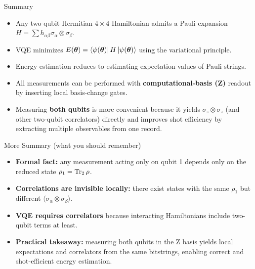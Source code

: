 \documentclass[aspectratio=169]{beamer}
\newcommand{\Z}{\sigma_z}
\begin{document}
\begin{frame}{Summary}
\begin{itemize}
  \item Any two-qubit Hermitian \(4\times 4\) Hamiltonian admits a Pauli expansion \(H=\sum h_{\alpha\beta}\sigma_\alpha\otimes\sigma_\beta\).
  \item VQE minimizes \(E(\bm{\theta})=\bra{\psi(\bm{\theta})}H\ket{\psi(\bm{\theta})}\) using the variational principle.
  \item Energy estimation reduces to estimating expectation values of Pauli strings.
  \item All measurements can be performed with \textbf{computational-basis (Z)} readout by inserting local basis-change gates.
  \item Measuring \textbf{both qubits} is more convenient because it yields \(\Z\otimes\Z\) (and other two-qubit correlators) directly and improves shot efficiency by extracting multiple observables from one record.
\end{itemize}
\end{frame}

\begin{frame}{More Summary (what you should remember)}
\begin{itemize}
\item \textbf{Formal fact:} any measurement acting only on qubit 1 depends only on the reduced state \(\rho_1=\Tr_2\rho\).
\item \textbf{Correlations are invisible locally:} there exist states with the same \(\rho_1\) but different \(\langle \sigma_\alpha\otimes\sigma_\beta\rangle\).
\item \textbf{VQE requires correlators} because interacting Hamiltonians include two-qubit terms at least.
\item \textbf{Practical takeaway:} measuring both qubits in the Z basis yields local expectations and correlators from the same bitstrings, enabling correct and shot-efficient energy estimation.
\end{itemize}
\end{frame}
\end{document}
